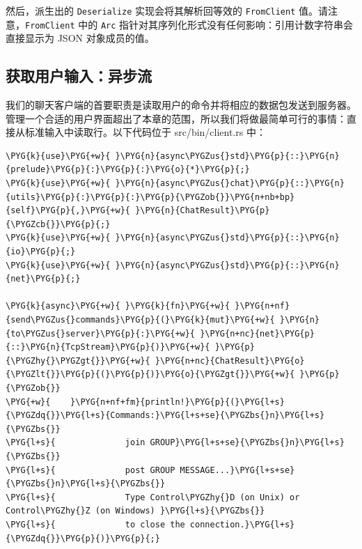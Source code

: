 然后，派生出的 \texttt{Deserialize} 实现会将其解析回等效的 \texttt{FromClient} 值。请注意，\texttt{FromClient} 中的 \texttt{Arc} 指针对其序列化形式没有任何影响：引用计数字符串会直接显示为 JSON 对象成员的值。

\subsection{获取用户输入：异步流}

我们的聊天客户端的首要职责是读取用户的命令并将相应的数据包发送到服务器。管理一个合适的用户界面超出了本章的范围，所以我们将做最简单可行的事情：直接从标准输入中读取行。以下代码位于 src/bin/client.rs 中：

\begin{Verbatim}[commandchars=\\\{\},breaklines=true,breakanywhere=true,fontsize=\codefont,xleftmargin=17bp]
\PYG{k}{use}\PYG{+w}{ }\PYG{n}{async\PYGZus{}std}\PYG{p}{::}\PYG{n}{prelude}\PYG{p}{:}\PYG{p}{:}\PYG{o}{*}\PYG{p}{;}
\PYG{k}{use}\PYG{+w}{ }\PYG{n}{async\PYGZus{}chat}\PYG{p}{::}\PYG{n}{utils}\PYG{p}{:}\PYG{p}{:}\PYG{p}{\PYGZob{}}\PYG{n+nb+bp}{self}\PYG{p}{,}\PYG{+w}{ }\PYG{n}{ChatResult}\PYG{p}{\PYGZcb{}}\PYG{p}{;}
\PYG{k}{use}\PYG{+w}{ }\PYG{n}{async\PYGZus{}std}\PYG{p}{::}\PYG{n}{io}\PYG{p}{;}
\PYG{k}{use}\PYG{+w}{ }\PYG{n}{async\PYGZus{}std}\PYG{p}{::}\PYG{n}{net}\PYG{p}{;}

\PYG{k}{async}\PYG{+w}{ }\PYG{k}{fn}\PYG{+w}{ }\PYG{n+nf}{send\PYGZus{}commands}\PYG{p}{(}\PYG{k}{mut}\PYG{+w}{ }\PYG{n}{to\PYGZus{}server}\PYG{p}{:}\PYG{+w}{ }\PYG{n+nc}{net}\PYG{p}{::}\PYG{n}{TcpStream}\PYG{p}{)}\PYG{+w}{ }\PYG{p}{\PYGZhy{}\PYGZgt{}}\PYG{+w}{ }\PYG{n+nc}{ChatResult}\PYG{o}{\PYGZlt{}}\PYG{p}{(}\PYG{p}{)}\PYG{o}{\PYGZgt{}}\PYG{+w}{ }\PYG{p}{\PYGZob{}}
\PYG{+w}{    }\PYG{n+nf+fm}{println!}\PYG{p}{(}\PYG{l+s}{\PYGZdq{}}\PYG{l+s}{Commands:}\PYG{l+s+se}{\PYGZbs{}n}\PYG{l+s}{\PYGZbs{}}
\PYG{l+s}{              join GROUP}\PYG{l+s+se}{\PYGZbs{}n}\PYG{l+s}{\PYGZbs{}}
\PYG{l+s}{              post GROUP MESSAGE...}\PYG{l+s+se}{\PYGZbs{}n}\PYG{l+s}{\PYGZbs{}}
\PYG{l+s}{              Type Control\PYGZhy{}D (on Unix) or Control\PYGZhy{}Z (on Windows) }\PYG{l+s}{\PYGZbs{}}
\PYG{l+s}{              to close the connection.}\PYG{l+s}{\PYGZdq{}}\PYG{p}{)}\PYG{p}{;}


\end{Verbatim}
